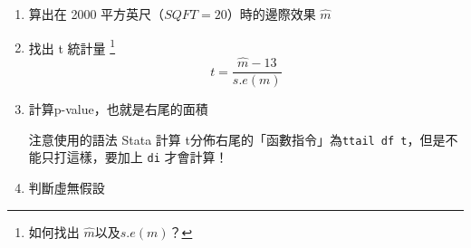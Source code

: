 \begin{frame}[plain]
    \begin{enumerate}
        \item 算出在 2000 平方英尺（$SQFT=20$）時的邊際效果 $\hat{m}$
        \item 找出 t 統計量
        \footnote{如何找出 $\hat{m}$以及$s.e(m)$？}
        \begin{equation*}
            t = \frac{\hat{m} - 13}{s.e(m)}
        \end{equation*}
        \item 計算p-value，也就是右尾的面積
        \begin{alertblock}{注意使用的語法}
            Stata 計算 t分佈右尾的「函數指令」為\texttt{ttail df t}，但是不能只打這樣，要加上 \texttt{di} 才會計算！
        \end{alertblock}
        \item 判斷虛無假設
    \end{enumerate}
\end{frame}